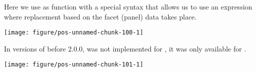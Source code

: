 \documentclass[paper=a4,headsepline,BCOR=12mm,twoside,open=right,%
titlepage,headings=small,fontsize=10pt,index=totoc,bibliography=totoc,%
captions=tableheading,captions=nooneline]{scrbook}\usepackage{knitr}
\begin{document}
\begin{knitrout}\footnotesize
{}\color{fgcolor}\begin{kframe}
\begin{alltt}
\hlopt{$} \hlkwb{<-} \hlopt{$}
                        \hlstd{=} \hlstd{(}\hlstd{,} \hlstd{,} \hlstd{))}
 \hlkwb{<-} \hlstd{(}   \hlopt{+}
      \hlstd{()} \hlopt{+}
       \hlopt{~}   
\end{alltt}
\end{kframe}
\end{knitrout}

Here we use as  function  with a special syntax that allows us to use an expression where replacement based on the facet (panel) data takes place.

\begin{knitrout}\footnotesize
{}\color{fgcolor}\begin{kframe}
\begin{alltt}
 \hlopt{+}  \hlopt{~}   \hlstd{=}  \hlopt{^} 
\end{alltt}
\end{kframe}

{\centering \texttt{[image: figure/pos-unnamed-chunk-100-1]} 

}



\end{knitrout}

In versions of  before 2.0.0,  was not implemented for , it was only available for .

\begin{knitrout}\footnotesize
{}\color{fgcolor}\begin{kframe}
\begin{alltt}
 \hlopt{+} \hlstd{(}\hlopt{~}   \hlstd{=}  \hlopt{^} 
\end{alltt}
\end{kframe}

{\centering \texttt{[image: figure/pos-unnamed-chunk-101-1]} 

}



\end{knitrout}
\end{document}
